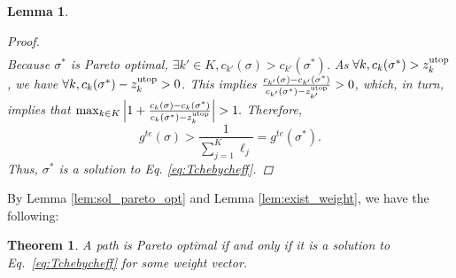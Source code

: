 \documentclass{article}
\newtheorem{thm}{Theorem}
\newtheorem{lem}{Lemma}
\begin{document}
\begin{lem}
\begin{proof}
\begin{eqnarray*}
\end{eqnarray*}
%
Because $ \sigma^{*} $ is Pareto optimal,
$\exists k' \in K, c_{k'} ( \sigma ) >  c_{k'} ( \sigma^{*} )$.
As $ \forall k,  c_{k}( \sigma^{*} ) > z^{\rm utop}_{k} $,
we have $ \forall k,  c_{k}( \sigma^{*} ) - z^{\rm utop}_{k} > 0 $.
This implies
$\frac{ c_{k'}( \sigma ) - c_{k'} ( \sigma^{*} )  }{  c_{k'} ( \sigma^{*} ) - z^{\rm utop}_{k'} }  > 0$,
which, in turn, implies that
$
\max_{k \in K} \left| 1 + \frac{ c_{k}( \sigma ) - c_{k} ( \sigma^{*} )  }{  c_{k} ( \sigma^{*} ) - z^{\rm utop}_{k} } \right| > 1.
$ %
Therefore,
\begin{equation}
g^{te} ( \sigma ) >  \frac{1}{\sum_{j=1}^K \ell_j} = g^{te} ( \sigma^{*} ).
\end{equation}
Thus, $  \sigma^{*} $ is a solution to Eq. \eqref{eq:Tchebycheff}.

\end{proof}
\end{lem}

By Lemma \ref{lem:sol_pareto_opt} and Lemma \ref{lem:exist_weight}, we have the following:

\begin{thm}
\label{thm:moo-d:rrt}
A path is Pareto optimal if and only if it is a solution to Eq.~\eqref{eq:Tchebycheff} for some weight vector.
\end{thm}
\end{document}

